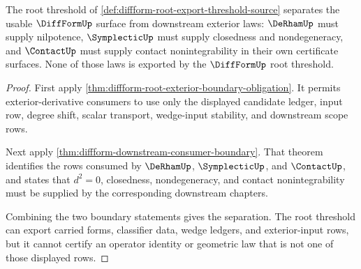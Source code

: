 \begin{theorem}
\label{thm:diffform-root-export-downstream-law-separation}
The root threshold of \autoref{def:diffform-root-export-threshold-source}
separates the usable $\DiffFormUp$ surface from downstream exterior laws:
$\DeRhamUp$ must supply nilpotence, $\SymplecticUp$ must supply closedness and
nondegeneracy, and $\ContactUp$ must supply contact nonintegrability in their
own certificate surfaces. None of those laws is exported by the
$\DiffFormUp$ root threshold.
\end{theorem}
\begin{proof}
First apply
\autoref{thm:diffform-root-exterior-boundary-obligation}. It permits
exterior-derivative consumers to use only the displayed candidate ledger,
input row, degree shift, scalar transport, wedge-input stability, and
downstream scope rows.

Next apply \autoref{thm:diffform-downstream-consumer-boundary}. That theorem
identifies the rows consumed by $\DeRhamUp$, $\SymplecticUp$, and
$\ContactUp$, and states that $d^2=0$, closedness, nondegeneracy, and contact
nonintegrability must be supplied by the corresponding downstream chapters.

Combining the two boundary statements gives the separation. The root
threshold can export carried forms, classifier data, wedge ledgers, and
exterior-input rows, but it cannot certify an operator identity or geometric
law that is not one of those displayed rows.
\end{proof}


